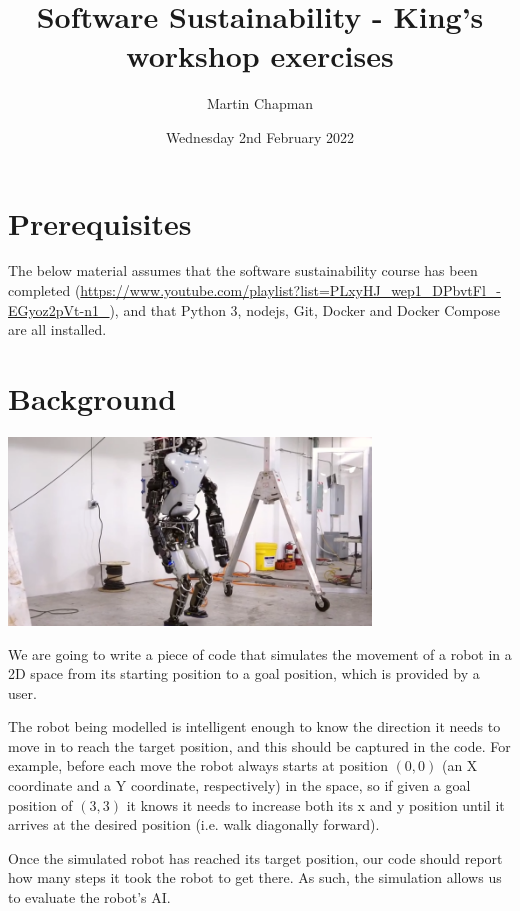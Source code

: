 \documentclass{article}
\title{Software Sustainability - King's workshop exercises}
\author{Martin Chapman}
\date{Wednesday 2nd February 2022}
\begin{document}

\maketitle

\section{Prerequisites}

The below material assumes that the software sustainability course has been completed (\href{https://www.youtube.com/playlist?list=PLxyHJ\_wep1\_DPbvtFl\_-EGyoz2pVt-n1\_}{https://www.youtube.com/playlist?list=PLxyHJ\_wep1\_DPbvtFl\_-EGyoz2pVt-n1\_}), and that Python 3, nodejs, Git, Docker and Docker Compose are all installed.

\section{Background}

\begin{center}
    \includegraphics[height=5cm]{robot.png}
\end{center}

We are going to write a piece of code that simulates the movement of a robot in a 2D space from its starting position to a goal position, which is provided by a user. 

The robot being modelled is intelligent enough to know the direction it needs to move in to reach the target position, and this should be captured in the code.
For example, before each move the robot always starts at position $(0, 0)$ (an X coordinate and a Y coordinate, respectively) in the space, so if given a goal position of $(3, 3)$ it knows it needs to increase both its x and y position until it arrives at the desired position (i.e. walk diagonally forward).

Once the simulated robot has reached its target position, our code should report how many steps it took the robot to get there.
As such, the simulation allows us to evaluate the robot's AI.
\end{document}
